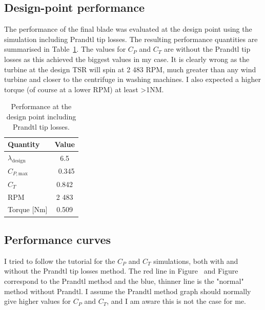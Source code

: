 \documentclass[11pt,a4paper]{article}
\begin{document}
\subsection{Design-point performance}

The performance of the final blade was evaluated at the design
point using the simulation including Prandtl tip losses. The
resulting performance quantities are summarised in
Table~\ref{tab:design-point-performance}. The values for $C_P$ and $C_T$
are without the Prandtl tip losses as this achieved the biggest values in my case.
It is clearly wrong as the turbine at the design TSR will spin at 2 483 RPM, much
greater than any wind turbine and closer to the centrifuge in washing machines.
I also expected a higher torque (of course at a lower RPM) at least >1NM.

\begin{table}[H]
    \centering
    
    \begin{tabular}{l c}
        \hline
        \textbf{Quantity} & \textbf{Value} \\
        \hline
        $\lambda_{\mathrm{design}}$ & 6.5 \\
        $C_{P,\mathrm{max}}$ & ~0.345 \\
        $C_T$ & 0.842 \\
        RPM & 2 483 \\
        Torque [Nm] & 0.509 \\
        \hline
    \end{tabular}
    \caption{Performance at the design point including Prandtl tip losses.}
    \label{tab:design-point-performance}
\end{table}


\subsection{Performance curves}

I tried to follow the tutorial for the $C_P$ and $C_T$ simulations,
both with and without the Prandtl tip losses method. The red line in Figure~\label{fig:Cp_tipSpeedRatio}
and Figure~\label{fig:Ct_tipSpeedRatio} correspond to the Prandtl method and the blue, thinner line
is the "normal" method without Prandtl. I assume the Prandtl method graph should normally give
higher values for $C_P$ and $C_T$, and I am aware this is not the case for me.
\end{document}
